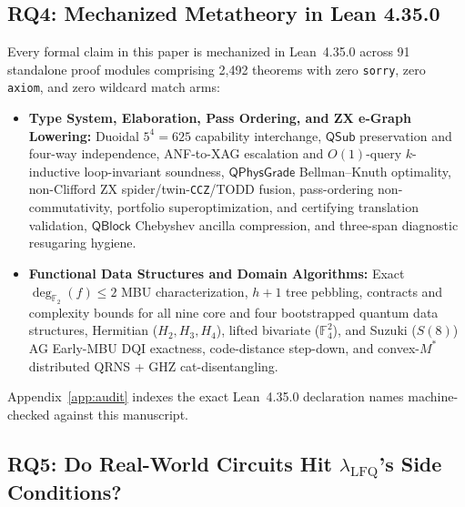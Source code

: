 \documentclass[acmsmall,screen,anonymous]{acmart}
\DeclareRobustCommand{\_}{\ifmmode\text{\char95}\else\char95\penalty0\relax\fi}
\theoremstyle{plain}
\newcommand{\QSub}{\ensuremath{\mathsf{QSub}}}
\newcommand{\QPhysGrade}{\ensuremath{\mathsf{QPhysGrade}}}
\newcommand{\QBlock}{\ensuremath{\mathsf{QBlock}}}
\begin{document}
\subsection{RQ4: Mechanized Metatheory in Lean 4.35.0}
\label{sec:lean}

Every formal claim in this paper is mechanized in Lean~4.35.0 across 91 standalone proof modules comprising 2,492 theorems with zero \texttt{sorry}, zero \texttt{axiom}, and zero wildcard match arms:
\begin{itemize}
  \item \textbf{Type System, Elaboration, Pass Ordering, and ZX e-Graph Lowering:} Duoidal $5^4 = 625$ capability interchange, $\QSub$ preservation and four-way independence, ANF-to-XAG escalation and $O(1)$-query $k$-inductive loop-invariant soundness, $\QPhysGrade$ Bellman--Knuth optimality, non-Clifford ZX spider/twin-\texttt{CCZ}/TODD fusion, pass-ordering non-commutativity, portfolio superoptimization, and certifying translation validation, $\QBlock$ Chebyshev ancilla compression, and three-span diagnostic resugaring hygiene.
  \item \textbf{Functional Data Structures and Domain Algorithms:} Exact $\deg_{\mathbb{F}_2}(f) \le 2$ MBU characterization, $h+1$ tree pebbling, contracts and complexity bounds for all nine core and four bootstrapped quantum data structures, Hermitian ($H_2, H_3, H_4$), lifted bivariate ($\mathbb{F}_4^2$), and Suzuki ($S(8)$) AG Early-MBU DQI exactness, code-distance step-down, and convex-$M^*$ distributed QRNS + GHZ cat-disentangling.
\end{itemize}
Appendix~\ref{app:audit} indexes the exact Lean~4.35.0 declaration names machine-checked against this manuscript.

\subsection{RQ5: Do Real-World Circuits Hit $\lambda_{\mathrm{LFQ}}$'s Side Conditions?}
\label{sec:audit}
\end{document}
